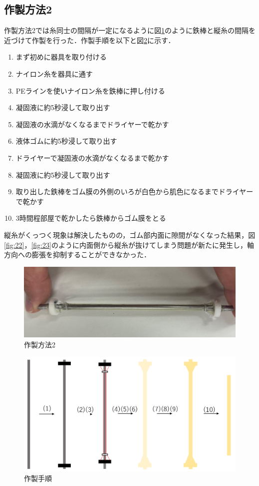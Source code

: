\newpage
\subsection{作製方法2}
作製方法2では糸同士の間隔が一定になるように図\ref{fig:20}のように鉄棒と縦糸の間隔を近づけて作製を行った．作製手順を以下と図\ref{fig:21}に示す．
\begin{enumerate}
  \item まず初めに器具を取り付ける
  \item ナイロン糸を器具に通す
  \item PEラインを使いナイロン糸を鉄棒に押し付ける
  \item 凝固液に約5秒浸して取り出す
  \item 凝固液の水滴がなくなるまでドライヤーで乾かす
  \item 液体ゴムに約5秒浸して取り出す
  \item ドライヤーで凝固液の水滴がなくなるまで乾かす
  \item 凝固液に約5秒浸して取り出す
  \item 取り出した鉄棒をゴム膜の外側のいろが白色から肌色になるまでドライヤーで乾かす
  \item 3時間程部屋で乾かしたら鉄棒からゴム膜をとる
\end{enumerate}


縦糸がくっつく現象は解決したものの，ゴム部内面に隙間がなくなった結果，図\ref{fig:22}，\ref{fig:23}のように内面側から縦糸が抜けてしまう問題が新たに発生し，軸方向への膨張を抑制することができなかった．

\begin{figure}[h]
  \centering  %
  \includegraphics[scale=0.2]{pic/19.jpg}
  \caption{作製方法2}
  \label{fig:20}
\end{figure}

\begin{figure}[t]
  \centering  %
  \vspace{20mm}
  \includegraphics[scale=0.4]{pic/19.PNG}
  \caption{作製手順}
  \label{fig:21}
\end{figure}




